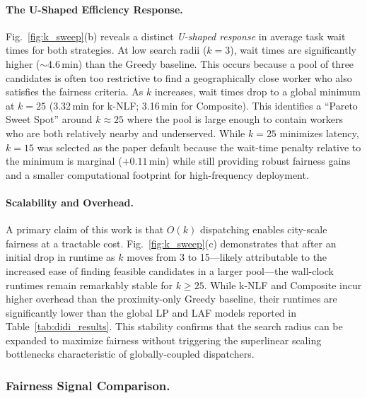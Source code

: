 \paragraph{The U-Shaped Efficiency Response.} 
Fig.~\ref{fig:k_sweep}(b) reveals a distinct \textit{U-shaped response} in average task wait times for both strategies. At low search radii ($k=3$), wait times are significantly higher ($\sim$4.6\,min) than the Greedy baseline. This occurs because a pool of three candidates is often too restrictive to find a geographically close worker who also satisfies the fairness criteria. As $k$ increases, wait times drop to a global minimum at $k=25$ (3.32\,min for k-NLF; 3.16\,min for Composite). This identifies a ``Pareto Sweet Spot'' around $k \approx 25$ where the pool is large enough to contain workers who are both relatively nearby and underserved. While $k=25$ minimizes latency, $k=15$ was selected as the paper default because the wait-time penalty relative to the minimum is marginal ($+0.11$\,min) while still providing robust fairness gains and a smaller computational footprint for high-frequency deployment.

\paragraph{Scalability and Overhead.} 
A primary claim of this work is that $O(k)$ dispatching enables city-scale fairness at a tractable cost. Fig.~\ref{fig:k_sweep}(c) demonstrates that after an initial drop in runtime as $k$ moves from 3 to 15---likely attributable to the increased ease of finding feasible candidates in a larger pool---the wall-clock runtimes remain remarkably stable for $k \geq 25$. While k-NLF and Composite incur higher overhead than the proximity-only Greedy baseline, their runtimes are significantly lower than the global LP and LAF models reported in Table~\ref{tab:didi_results}. This stability confirms that the search radius can be expanded to maximize fairness without triggering the superlinear scaling bottlenecks characteristic of globally-coupled dispatchers.

\subsubsection{Fairness Signal Comparison.}
\label{sec:signal_comparison}

